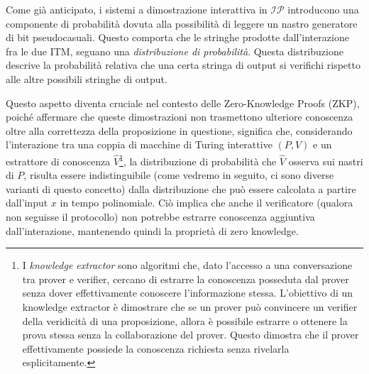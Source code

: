\documentclass{article}
\theoremstyle{definition}
\begin{document}
Come già anticipato, i sistemi a dimostrazione interattiva in \texttt{$\mathcal{IP}$} introducono una componente di probabilità dovuta alla possibilità di leggere un nastro generatore di bit pseudocasuali. Questo comporta che le stringhe prodotte dall'interazione fra le due ITM, seguano una \emph{distribuzione di probabilità}. Questa distribuzione descrive la probabilità relativa che una certa stringa di output si verifichi rispetto alle altre possibili stringhe di output.

Questo aspetto diventa cruciale nel contesto delle Zero-Knowledge Proofs (ZKP), poiché affermare che queste dimostrazioni non trasmettono ulteriore conoscenza oltre alla correttezza della proposizione in questione, significa che, considerando l'interazione tra una coppia di macchine di Turing interattive $(P, V)$ e un estrattore di conoscenza $\hat{V}$\footnote{I \emph{knowledge extractor} sono algoritmi che, dato l'accesso a una conversazione tra prover e verifier, cercano di estrarre la conoscenza posseduta dal prover senza dover effettivamente conoscere l'informazione stessa. L'obiettivo di un knowledge extractor è dimostrare che se un prover può convincere un verifier della veridicità di una proposizione, allora è possibile estrarre o ottenere la prova stessa senza la collaborazione del prover. Questo dimostra che il prover effettivamente possiede la conoscenza richiesta senza rivelarla esplicitamente.}, la distribuzione di probabilità che $\hat{V}$ osserva sui nastri di $P$, risulta essere indistinguibile (come vedremo in seguito, ci sono diverse varianti di questo concetto) dalla distribuzione che può essere calcolata a partire dall'input $x$ in tempo polinomiale. Ciò implica che anche il verificatore (qualora non seguisse il protocollo) non potrebbe estrarre conoscenza aggiuntiva dall'interazione, mantenendo quindi la proprietà di zero knowledge.
\end{document}
